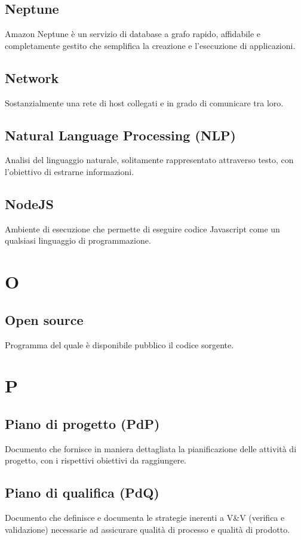 \documentclass{classes/base}
\begin{document}
        \subsection*{Neptune}
        Amazon Neptune è un servizio di database a grafo rapido, affidabile e completamente gestito che semplifica la creazione e l'esecuzione di applicazioni.

        \subsection*{Network}
        Sostanzialmente una rete di host collegati e in grado di comunicare tra loro.

        \subsection*{Natural Language Processing (NLP)}
        Analisi del linguaggio naturale, solitamente rappresentato attraverso testo, con l'obiettivo di estrarne informazioni.

        \subsection*{NodeJS}
        Ambiente di esecuzione che permette di eseguire codice Javascript come un qualsiasi linguaggio di programmazione.
        \newpage  
    \section{O}
        \subsection*{Open source}
        Programma del quale è disponibile pubblico il codice sorgente.
        \newpage  
    \section{P}
        \subsection*{Piano di progetto (PdP)}
        Documento che fornisce in maniera dettagliata la pianificazione delle attività di progetto, con i rispettivi obiettivi da raggiungere. 

        \subsection*{Piano di qualifica (PdQ)} 
        Documento che definisce e documenta le strategie inerenti a V\&V (verifica e validazione) necessarie ad assicurare qualità di processo e qualità di prodotto.
\end{document}
